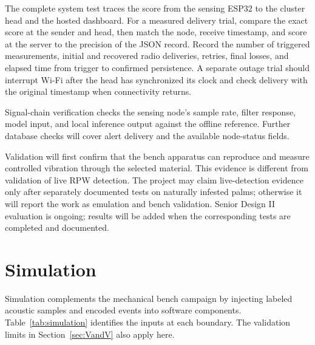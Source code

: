\documentclass[12pt,a4paper,oneside]{memoir}
\newcommand{\newrevision}[1]{#1}
\begin{document}
\label{sec:VandV}

\newrevision{The complete system test traces the score from the sensing ESP32 to the cluster head and the hosted dashboard. For a measured delivery trial, compare the exact score at the sender and head, then match the node, receive timestamp, and score at the server to the precision of the JSON record. Record the number of triggered measurements, initial and recovered radio deliveries, retries, final losses, and elapsed time from trigger to confirmed persistence. A separate outage trial should interrupt Wi-Fi after the head has synchronized its clock and check delivery with the original timestamp when connectivity returns.}

\newrevision{Signal-chain verification checks the sensing node's sample rate, filter response, model input, and local inference output against the offline reference. Further database checks will cover alert delivery and the available node-status fields.}

\newrevision{Validation will first confirm that the bench apparatus can reproduce and measure controlled vibration through the selected material. This evidence is different from validation of live RPW detection. The project may claim live-detection evidence only after separately documented tests on naturally infested palms; otherwise it will report the work as emulation and bench validation. Senior Design II evaluation is ongoing; results will be added when the corresponding tests are completed and documented.}

\section{Simulation}
\label{sec:Simulation}

\newrevision{Simulation complements the mechanical bench campaign by injecting labeled acoustic samples and encoded events into software components. Table~\ref{tab:simulation} identifies the inputs at each boundary. The validation limits in Section~\ref{sec:VandV} also apply here.}
\end{document}
